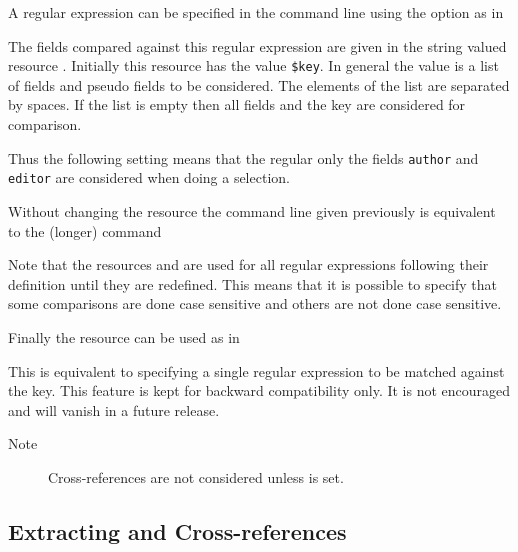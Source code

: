\documentclass[11pt,a4paper]{scrbook}
\begin{document}
A regular expression can be specified in the command line using the option
 as in


The fields compared against this regular expression are given in the string
valued resource . Initially this resource has the value
\verb|$key|. In general the value is a list of fields and pseudo fields to be
considered. The elements of the list are separated by spaces. If the list is
empty then all fields and the key are considered for comparison.

Thus the following setting means that the regular only the fields \verb|author|
and \verb|editor| are considered when doing a selection.

\begin{Resources}
\end{Resources}

Without changing the resource  the command line given
previously is equi\-va\-lent to the (longer) command


Note that the resources  and 
are used for all regular expressions following their definition until they are
redefined. This means that it is possible to specify that some comparisons are
done case sensitive and others are not done case sensitive.


Finally the resource  can be used as in

\begin{Resources}
\end{Resources}

This is equivalent to specifying a single regular expression to be matched
against the key. This feature is kept for backward compatibility only. It is
not encouraged and will vanish in a future release.

\begin{description}
\item[Note] Cross-references are not considered unless 
  is set.
\end{description}

\subsection{Extracting and Cross-references}\label{sec:xref}
\end{document}

